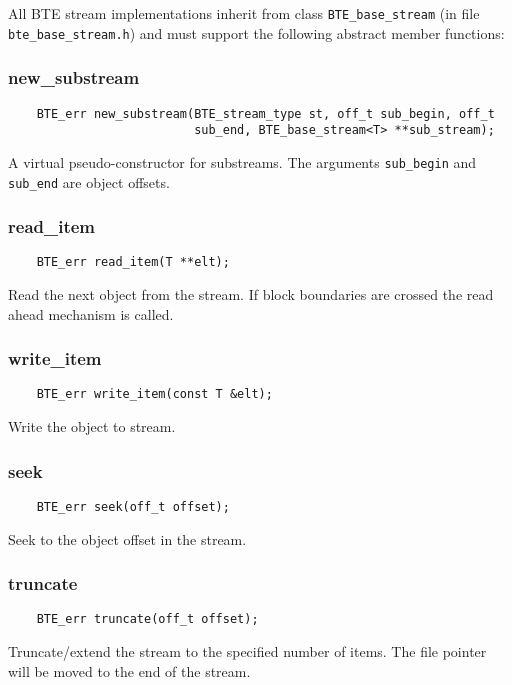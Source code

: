 All BTE stream implementations inherit from class \verb|BTE_base_stream|
(in file \verb|bte_base_stream.h|) and must support the following abstract
member functions:

\subsubsection{new\_substream}
\begin{verbatim}
    BTE_err new_substream(BTE_stream_type st, off_t sub_begin, off_t
                          sub_end, BTE_base_stream<T> **sub_stream);
\end{verbatim}
A virtual pseudo-constructor for substreams. The arguments \verb|sub_begin| and
\verb|sub_end| are object offsets.


\subsubsection{read\_item}
\begin{verbatim}
    BTE_err read_item(T **elt);
\end{verbatim}
Read the next object from the stream. If block boundaries are crossed the
read ahead mechanism is called.

\subsubsection{write\_item}
\begin{verbatim}
    BTE_err write_item(const T &elt);
\end{verbatim}
Write the object to stream.


\subsubsection{seek}
\begin{verbatim}
    BTE_err seek(off_t offset);
\end{verbatim}
Seek to the object offset in the stream.


\subsubsection{truncate}
\begin{verbatim}
    BTE_err truncate(off_t offset);
\end{verbatim}
Truncate/extend the stream to the specified number of items. The file
pointer will be moved to the end of the stream.


